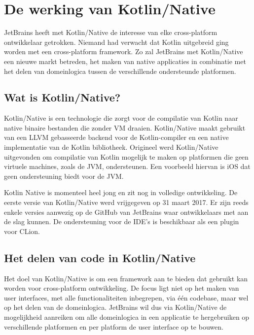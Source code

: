 
\chapter{De werking van Kotlin/Native}
JetBrains heeft met Kotlin/Native de interesse van elke cross-platform ontwikkelaar getrokken. Niemand had verwacht dat Kotlin uitgebreid ging worden met een cross-platform framework. Zo zal JetBrains met Kotlin/Native een nieuwe markt betreden, het maken van native applicaties in combinatie met het delen van domeinlogica tussen de verschillende ondersteunde platformen.
\label{ch:kotlinnative}

\section{Wat is Kotlin/Native?}
Kotlin/Native is een technologie die zorgt voor de compilatie van Kotlin naar native binaire bestanden die zonder VM draaien. Kotlin/Native maakt gebruikt van een LLVM gebasseerde backend voor de Kotlin-compiler en een native implementatie van de Kotlin bibliotheek. Origineel werd Kotlin/Native uitgevonden om compilatie van Kotlin mogelijk te maken op platformen die geen virtuele machines, zoals de JVM, ondersteunen. Een voorbeeld hiervan is iOS dat geen ondersteuning biedt voor de JVM.

Kotlin Native is momenteel heel jong en zit nog in volledige ontwikkeling. De eerste versie van Kotlin/Native werd vrijgegeven op 31 maart 2017. Er zijn reeds enkele versies aanwezig op de GitHub van JetBrains waar ontwikkelaars met aan de slag kunnen. De ondersteuning voor de IDE's is beschikbaar als een plugin voor CLion.

\section{Het delen van code in Kotlin/Native}
\label{sec:sharingcode}
Het doel van Kotlin/Native is om een framework aan te bieden dat gebruikt kan worden voor cross-platform ontwikkeling. De focus ligt niet op het maken van user interfaces, met alle functionaliteiten inbegrepen, via één codebase, maar wel op het delen van de domeinlogica. JetBrains wil dus via Kotlin/Native de mogelijkheid aanreiken om alle domeinlogica in een applicatie te hergebruiken op verschillende platformen en per platform de user interface op te bouwen.

